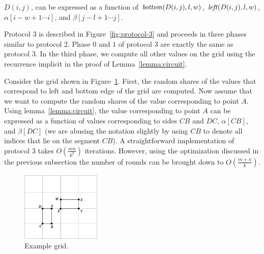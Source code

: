 \begin{lemma}
\rm
\label{lemma:circuit}
$D(i,j)$, can be expressed as a function of ${\it bottom}(D(i,j),l,w)$,
${\it left}(D(i,j),l,w)$, $ \alpha [ i-w+1 \cdots  i ]$, and $\beta [ j-l+1 \cdots j]$.
\end{lemma}



Protocol 3 is described in Figure~\ref{fig:protocol-3} and proceeds in
three phases similar to protocol 2.  Phase $0$ and $1$ of protocol 3 are
exactly the same as protocol 3. In the third phase, we compute all other
values on the grid using the recurrence implicit in the proof of
Lemma~\ref{lemma:circuit}.

Consider the grid shown in Figure~\ref{fig:grid}.  First, the random
shares of the values that correspond to left and bottom edge of the grid
are computed.  Now assume that we want to compute the random shares of
the value corresponding to point $A$. Using lemma~\ref{lemma:circuit},
the value corresponding to point $A$ can be expressed as a function of
values corresponding to sides $CB$ and $DC$, $\alpha [CB]$, and $\beta
[DC]$ (we are abusing the notation slightly by using $CB$ to denote all
indices that lie on the segment $CB$). A straightforward implementation
of protocol $3$ takes $O( \frac{mn}{k^2})$ iterations. However, using
the optimization discussed in the previous subsection the number of
rounds can be brought down to $O(\frac{m+n}{k})$.



\begin{figure}
\centering
    \includegraphics[height=1.3in]{genomics/grid.pdf}
\caption{Example grid.}
\label{fig:grid}
\end{figure}

